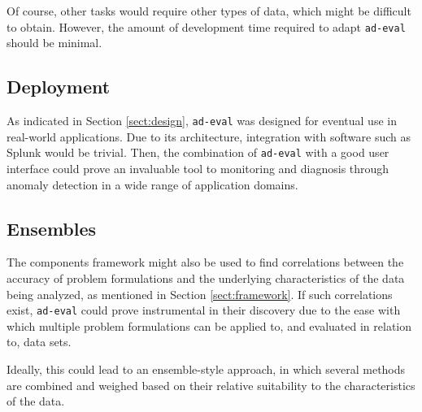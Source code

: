 Of course, other tasks would require other types of data, which might be difficult to obtain. However, the amount of development time required to adapt \texttt{ad-eval} should be minimal.

\subsection{Deployment}

As indicated in Section \ref{sect:design}, \texttt{ad-eval} was designed for eventual use in real-world applications. Due to its architecture, integration with software such as Splunk would be trivial. Then, the combination of \texttt{ad-eval} with a good user interface could prove an invaluable tool to monitoring and diagnosis through anomaly detection in a wide range of application domains. 

\subsection{Ensembles}

The components framework might also be used to find correlations between the accuracy of problem formulations and the underlying characteristics of the data being analyzed, as mentioned in Section \ref{sect:framework}. If such correlations exist, \texttt{ad-eval} could prove instrumental in their discovery due to the ease with which multiple problem formulations can be applied to, and evaluated in relation to, data sets.

Ideally, this could lead to an ensemble-style approach, in which several methods are combined and weighed based on their relative suitability to the characteristics of the data.
